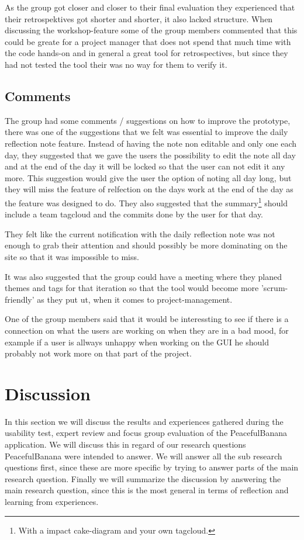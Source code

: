 As the group got closer and closer to their final evaluation they experienced that their retrospektives got shorter and shorter, it also lacked structure. When discussing the workshop-feature some of the group members commented that this could be greate for a project manager that does not spend that much time with the code hands-on and in general a great tool for retrospectives, but since they had not tested the tool their was no way for them to verify it.

\subsection{Comments}
The group had some comments / suggestions on how to improve the prototype, there was one of the suggestions that we felt was essential to improve the daily reflection note feature. Instead of having the note non editable and only one each day, they suggested that we gave the users the possibility to edit the note all day and at the end of the day it will be locked so that the user can not edit it any more. This suggestion would give the user the option of noting all day long, but they will miss the feature of relfection on the days work at the end of the day as the feature was designed to do. They also suggested that the summary\footnote{With a impact cake-diagram and your own tagcloud.} should include a team tagcloud and the commits done by the user for that day.

They felt like the current notification with the daily reflection note was not enough to grab their attention and should possibly be more dominating on the site so that it was impossible to miss.

It was also suggested that the group could have a meeting where they planed themes and tags for that iteration so that the tool would become more 'scrum-friendly' as they put ut, when it comes to project-management. 

One of the group members said that it would be interessting to see if there is a connection on what the users are working on when they are in a bad mood, for example if a user is allways unhappy when working on the GUI he should probably not work more on that part of the project.


\section{Discussion}
In this section we will discuss the results and experiences gathered during the usability test, expert review and focus group evaluation of the PeacefulBanana application. We will discuss this in regard of our research questions PeacefulBanana were intended to answer. We will answer all the sub research questions first, since these are more specific by trying to answer parts of the main research question. Finally we will summarize the discussion by answering the main research question, since this is the most general in terms of reflection and learning from experiences. 

